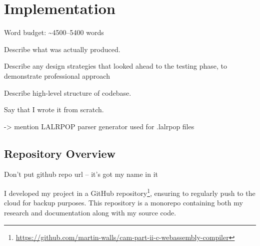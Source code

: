 \documentclass[00-main.tex]{subfiles}
\begin{document}
\chapter{Implementation}

\begin{Comment}
Word budget: \textasciitilde 4500--5400 words
\end{Comment}

\begin{Comment}
Describe what was actually produced.

Describe any design strategies that looked ahead to the testing phase, to demonstrate professional approach
\end{Comment}
\begin{Comment}
Describe high-level structure of codebase.

Say that I wrote it from scratch.

-> mention LALRPOP parser generator used for .lalrpop files
\end{Comment}

\section{Repository Overview}

\newcommand{\DTfile}[1]{#1}
\newcommand{\DTdir}[1]{\textbf{#1}/}

\begin{Comment}
Don't put github repo url -- it's got my name in it
\end{Comment}

I developed my project in a GitHub repository\footnote{\url{https://github.com/martin-walls/cam-part-ii-c-webassembly-compiler}}, ensuring to regularly push to the cloud for backup purposes.
This repository is a monorepo containing both my research and documentation along with my source code.

\DTsetlength{0.2em}{1em}{0.2em}{0.4pt}{2pt}

\makeatletter
\newcommand \Dotfill {\leavevmode \cleaders \hb@xt@ .7em{\hss .\hss }\hfill \kern \z@}
\makeatother
\renewcommand{\DTcomment}[1]{%
\Dotfill
\rmfamily
\begin{minipage}[t]{8cm}
#1
\end{minipage}
}
\end{document}

